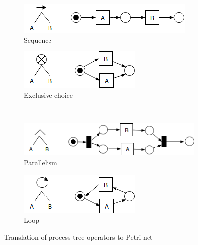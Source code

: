 \begin{figure}[!h]
	\centering
	\begin{subfigure}[b]{0.45\textwidth}
		\centering
		\includegraphics[width=\linewidth]{figures/preliminary/PT_PN_corresponding_01_seq_PN.png}
		\caption{Sequence}
		\label{fig:pt_pn_seq}
	\end{subfigure}%
	\quad
	\begin{subfigure}[b]{0.45\textwidth}
		\centering
		\includegraphics[width=\linewidth]{figures/preliminary/PT_PN_corresponding_02_xor_PN.png}
		\caption{Exclusive choice}
		\label{fig:pt_pn_xor}
	\end{subfigure}%
	\\ %
	\begin{subfigure}[b]{0.45\textwidth}
		\centering
		\includegraphics[width=\linewidth]{figures/preliminary/PT_PN_corresponding_03_and_PN.png}
		\caption{ Parallelism }
		\label{fig:pt_pn_and}
	\end{subfigure}%
	\quad
	\begin{subfigure}[b]{0.45\textwidth}
		\centering
		\includegraphics[width=\linewidth]{figures/preliminary/PT_PN_corresponding_04_loop_PN.png}
		\caption{Loop}
		\label{fig:pt_pn_loop}
	\end{subfigure}%
	\caption{Translation of process tree operators to Petri net}
	\label{fig:pn_pt_correspondings}
\end{figure}
